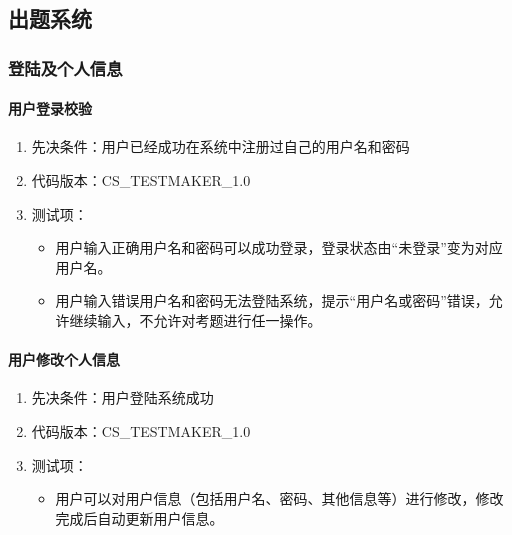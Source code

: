 \documentclass[hyperref, a4paper]{ctexart}
\providecommand{\tightlist}{%
  \setlength{\itemsep}{0pt}\setlength{\parskip}{0pt}}
\let\oldparagraph\paragraph
\renewcommand{\paragraph}[1]{\oldparagraph{#1}\mbox{}}
\begin{document}
\hypertarget{ux51faux9898ux7cfbux7edf}{%
\subsection{出题系统}\label{ux51faux9898ux7cfbux7edf}}

\hypertarget{ux767bux9646ux53caux4e2aux4ebaux4fe1ux606f}{%
\subsubsection{登陆及个人信息}\label{ux767bux9646ux53caux4e2aux4ebaux4fe1ux606f}}

\hypertarget{ux7528ux6237ux767bux5f55ux6821ux9a8c}{%
\paragraph{用户登录校验}\label{ux7528ux6237ux767bux5f55ux6821ux9a8c}}

\begin{enumerate}
\def\labelenumi{\arabic{enumi}.}
\tightlist
\item
  先决条件：用户已经成功在系统中注册过自己的用户名和密码
\item
  代码版本：CS\_TESTMAKER\_1.0
\item
  测试项：

  \begin{itemize}
  \tightlist
  \item
    用户输入正确用户名和密码可以成功登录，登录状态由``未登录''变为对应用户名。
  \item
    用户输入错误用户名和密码无法登陆系统，提示``用户名或密码''错误，允许继续输入，不允许对考题进行任一操作。
  \end{itemize}
\end{enumerate}

\hypertarget{ux7528ux6237ux4feeux6539ux4e2aux4ebaux4fe1ux606f}{%
\paragraph{用户修改个人信息}\label{ux7528ux6237ux4feeux6539ux4e2aux4ebaux4fe1ux606f}}

\begin{enumerate}
\def\labelenumi{\arabic{enumi}.}
\tightlist
\item
  先决条件：用户登陆系统成功
\item
  代码版本：CS\_TESTMAKER\_1.0
\item
  测试项：

  \begin{itemize}
  \tightlist
  \item
    用户可以对用户信息（包括用户名、密码、其他信息等）进行修改，修改完成后自动更新用户信息。
  \end{itemize}
\end{enumerate}
\end{document}
